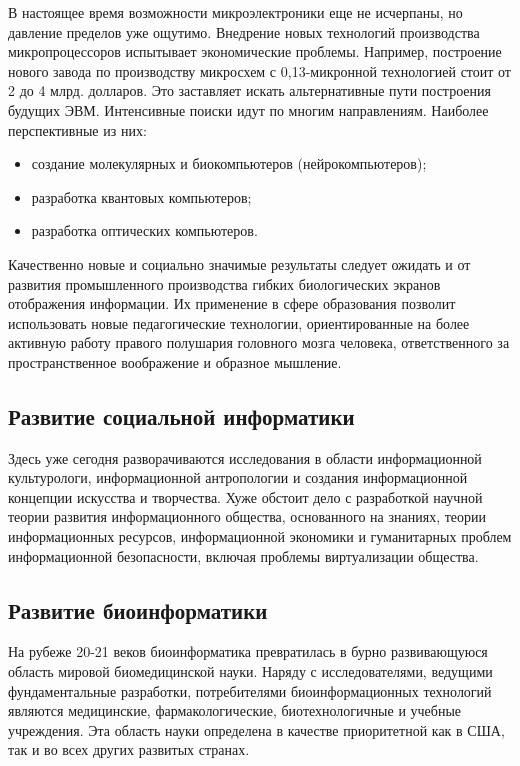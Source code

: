 В настоящее время возможности микроэлектроники еще не исчерпаны, но давление пределов уже ощутимо. Внедрение новых технологий производства микропроцессоров испытывает экономические проблемы. Например, построение нового завода по производству микросхем с 0,13-микронной технологией стоит от 2 до 4 млрд. долларов. Это заставляет искать альтернативные пути построения будущих ЭВМ. Интенсивные поиски идут по многим направлениям. Наиболее перспективные из них:
\begin{itemize}
\item создание молекулярных и биокомпьютеров (нейрокомпьютеров);
\item разработка квантовых компьютеров;
\item разработка оптических компьютеров.
\end{itemize}

Качественно новые и социально значимые результаты следует ожидать и от развития промышленного производства гибких биологических экранов отображения информации. Их применение в сфере образования позволит использовать новые педагогические технологии, ориентированные на более активную работу правого полушария головного мозга человека, ответственного за пространственное воображение и образное мышление\cite{bib105}.


\subsection{Развитие социальной информатики} \label{sect2_2_3}

Здесь уже сегодня разворачиваются исследования в области информационной культурологи, информационной антропологии и создания информационной концепции искусства и творчества. Хуже обстоит дело с разработкой научной теории развития информационного общества, основанного на знаниях, теории информационных ресурсов, информационной экономики и гуманитарных проблем информационной безопасности, включая проблемы виртуализации общества.

\subsection{Развитие биоинформатики} \label{sect2_2_4}

На рубеже 20-21 веков биоинформатика превратилась в бурно развивающуюся область мировой биомедицинской науки. Наряду с исследователями, ведущими фундаментальные разработки, потребителями биоинформационных технологий являются медицинские, фармакологические, биотехнологичные и учебные учреждения. Эта область науки определена в качестве приоритетной как в США, так и во всех других развитых странах. 

